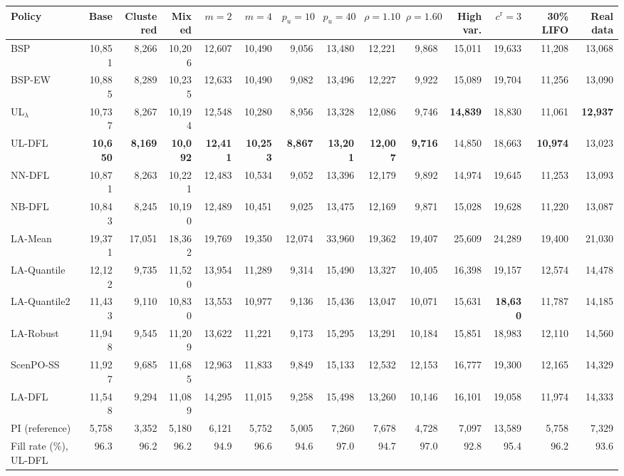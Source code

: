 \begin{tabular}{lrrrrrrrrrrrrr}
\toprule
Policy & Base & Clustered & Mixed & $m=2$ & $m=4$ & $p_u=10$ & $p_u=40$ & $\rho=1.10$ & $\rho=1.60$ & High var. & $c^{\mathrm{r}}=3$ & 30\% LIFO & Real data \\
\midrule
BSP & 10,851 & 8,266 & 10,206 & 12,607 & 10,490 & 9,056 & 13,480 & 12,221 & 9,868 & 15,011 & 19,633 & 11,208 & 13,068 \\
BSP-EW & 10,885 & 8,289 & 10,235 & 12,633 & 10,490 & 9,082 & 13,496 & 12,227 & 9,922 & 15,089 & 19,704 & 11,256 & 13,090 \\
UL$_\lambda$ & 10,737 & 8,267 & 10,194 & 12,548 & 10,280 & 8,956 & 13,328 & 12,086 & 9,746 & \textbf{14,839} & 18,830 & 11,061 & \textbf{12,937} \\
UL-DFL & \textbf{10,650} & \textbf{8,169} & \textbf{10,092} & \textbf{12,411} & \textbf{10,253} & \textbf{8,867} & \textbf{13,201} & \textbf{12,007} & \textbf{9,716} & 14,850 & 18,663 & \textbf{10,974} & 13,023 \\
NN-DFL & 10,871 & 8,263 & 10,221 & 12,483 & 10,534 & 9,052 & 13,396 & 12,179 & 9,892 & 14,974 & 19,645 & 11,253 & 13,093 \\
NB-DFL & 10,843 & 8,245 & 10,190 & 12,489 & 10,451 & 9,025 & 13,475 & 12,169 & 9,871 & 15,028 & 19,628 & 11,220 & 13,087 \\
LA-Mean & 19,371 & 17,051 & 18,362 & 19,769 & 19,350 & 12,074 & 33,960 & 19,362 & 19,407 & 25,609 & 24,289 & 19,400 & 21,030 \\
LA-Quantile & 12,122 & 9,735 & 11,520 & 13,954 & 11,289 & 9,314 & 15,490 & 13,327 & 10,405 & 16,398 & 19,157 & 12,574 & 14,478 \\
LA-Quantile2 & 11,433 & 9,110 & 10,830 & 13,553 & 10,977 & 9,136 & 15,436 & 13,047 & 10,071 & 15,631 & \textbf{18,630} & 11,787 & 14,185 \\
LA-Robust & 11,948 & 9,545 & 11,209 & 13,622 & 11,221 & 9,173 & 15,295 & 13,291 & 10,184 & 15,851 & 18,983 & 12,110 & 14,560 \\
ScenPO-SS & 11,927 & 9,685 & 11,685 & 12,963 & 11,833 & 9,849 & 15,133 & 12,532 & 12,153 & 16,777 & 19,300 & 12,165 & 14,329 \\
LA-DFL & 11,548 & 9,294 & 11,089 & 14,295 & 11,015 & 9,258 & 15,498 & 13,260 & 10,146 & 16,101 & 19,058 & 11,974 & 14,333 \\
\midrule
PI (reference) & 5,758 & 3,352 & 5,180 & 6,121 & 5,752 & 5,005 & 7,260 & 7,678 & 4,728 & 7,097 & 13,589 & 5,758 & 7,329 \\
\midrule
Fill rate (\%), UL-DFL & 96.3 & 96.2 & 96.2 & 94.9 & 96.6 & 94.6 & 97.0 & 94.7 & 97.0 & 92.8 & 95.4 & 96.2 & 93.6 \\

\end{tabular}
